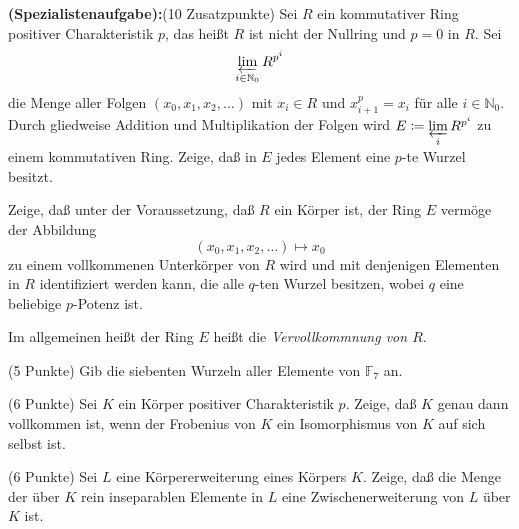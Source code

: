 \documentclass{algsheet}
\begin{document}
\begin{exercise}\textbf{(Spezialistenaufgabe):}(10 Zusatzpunkte)\newline
    Sei \(R\) ein kommutativer Ring positiver Charakteristik \(p\), das heißt
    \(R\) ist nicht der Nullring und \(p = 0\) in \(R\). Sei
    \begin{equation}
        \varprojlim_{i \in \mathbb N_0} R^{p^i}
    \end{equation}
    die Menge aller Folgen \((x_0, x_1, x_2, \dotsc)\) mit \(x_i \in R\) und
    \(x_{i + 1}^p = x_i\) für alle \(i \in \mathbb N_0\). Durch gliedweise Addition
    und Multiplikation der Folgen wird \(E \coloneqq \varprojlim\limits_i R^{p^i}\) zu
    einem kommutativen Ring. Zeige, daß in \(E\) jedes Element eine \(p\)-te Wurzel
    besitzt.
    
    Zeige, daß unter der Voraussetzung, daß \(R\) ein Körper ist, der Ring \(E\)
    vermöge der Abbildung
    \begin{equation}
        (x_0, x_1, x_2, \dotsc) \mapsto x_0
    \end{equation}
    zu einem vollkommenen Unterkörper von \(R\) wird und mit denjenigen Elementen
    in \(R\) identifiziert werden kann, die alle \(q\)-ten Wurzel besitzen, wobei
    \(q\) eine beliebige \(p\)-Potenz ist.
    
    Im allgemeinen heißt der Ring \(E\) heißt die
    \emph{Vervollkommnung von \(R\)}.
\end{exercise}



\begin{exercise}(5 Punkte)\newline
    Gib die siebenten Wurzeln aller Elemente von \(\mathbb F_7\) an.
\end{exercise}





\begin{exercise}(6 Punkte)\newline
    Sei \(K\) ein Körper positiver Charakteristik \(p\). Zeige, daß \(K\) genau
    dann vollkommen ist, wenn der Frobenius von \(K\) ein Isomorphismus von \(K\)
    auf sich selbst ist.
\end{exercise}


\begin{exercise}(6 Punkte)\newline
    Sei \(L\) eine Körpererweiterung eines Körpers \(K\). Zeige, daß die Menge
    der über \(K\) rein inseparablen Elemente in \(L\) eine Zwischenerweiterung
    von \(L\) über \(K\) ist.
\end{exercise}
\end{document}

